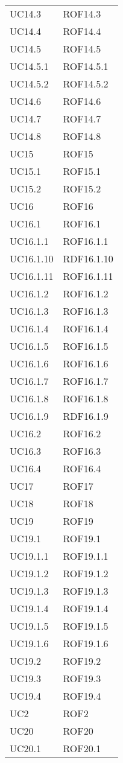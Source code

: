 \begin{longtable}{p{2.5cm}!{\VRule[1pt]}p{2.5cm}}
	UC14.3 & ROF14.3\\
	UC14.4 & ROF14.4\\
	UC14.5 & ROF14.5\\
	UC14.5.1 & ROF14.5.1\\
	UC14.5.2 & ROF14.5.2\\
	UC14.6 & ROF14.6\\
	UC14.7 & ROF14.7\\
	UC14.8 & ROF14.8\\
	UC15 & ROF15\\
	UC15.1 & ROF15.1\\
	UC15.2 & ROF15.2\\
	UC16 & ROF16\\
	UC16.1 & ROF16.1\\
	UC16.1.1 & ROF16.1.1\\
	UC16.1.10 & RDF16.1.10\\
	UC16.1.11 & ROF16.1.11\\
	UC16.1.2 & ROF16.1.2\\
	UC16.1.3 & ROF16.1.3\\
	UC16.1.4 & ROF16.1.4\\
	UC16.1.5 & ROF16.1.5\\
	UC16.1.6 & ROF16.1.6\\
	UC16.1.7 & ROF16.1.7\\
	UC16.1.8 & ROF16.1.8\\
	UC16.1.9 & RDF16.1.9\\
	UC16.2 & ROF16.2\\
	UC16.3 & ROF16.3\\
	UC16.4 & ROF16.4\\
	UC17 & ROF17\\
	UC18 & ROF18\\
	UC19 & ROF19\\
	UC19.1 & ROF19.1\\
	UC19.1.1 & ROF19.1.1\\
	UC19.1.2 & ROF19.1.2\\
	UC19.1.3 & ROF19.1.3\\
	UC19.1.4 & ROF19.1.4\\
	UC19.1.5 & ROF19.1.5\\
	UC19.1.6 & ROF19.1.6\\
	UC19.2 & ROF19.2\\
	UC19.3 & ROF19.3\\
	UC19.4 & ROF19.4\\
	UC2 & ROF2\\
	UC20 & ROF20\\
	UC20.1 & ROF20.1\\

\end{longtable}

